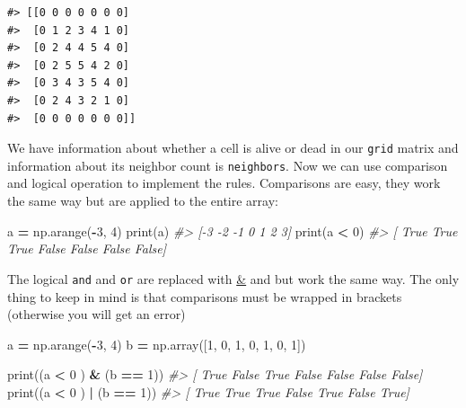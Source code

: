 \documentclass[
]{book}
\newenvironment{Shaded}{\begin{snugshade}}{\end{snugshade}}
\newcommand{\BuiltInTok}[1]{#1}
\newcommand{\CommentTok}[1]{\textcolor[rgb]{0.56,0.35,0.01}{\textit{#1}}}
\newcommand{\DecValTok}[1]{\textcolor[rgb]{0.00,0.00,0.81}{#1}}
\newcommand{\NormalTok}[1]{#1}
\newcommand{\OperatorTok}[1]{\textcolor[rgb]{0.81,0.36,0.00}{\textbf{#1}}}
\begin{document}
\begin{verbatim}
#> [[0 0 0 0 0 0 0]
#>  [0 1 2 3 4 1 0]
#>  [0 2 4 4 5 4 0]
#>  [0 2 5 5 4 2 0]
#>  [0 3 4 3 5 4 0]
#>  [0 2 4 3 2 1 0]
#>  [0 0 0 0 0 0 0]]
\end{verbatim}

We have information about whether a cell is alive or dead in our \texttt{grid} matrix and information about its neighbor count is \texttt{neighbors}. Now we can use comparison and logical operation to implement the rules. Comparisons are easy, they work the same way but are applied to the entire array:

\begin{Shaded}
\begin{Highlighting}[]
\NormalTok{a }\OperatorTok{=}\NormalTok{ np.arange(}\OperatorTok{{-}}\DecValTok{3}\NormalTok{, }\DecValTok{4}\NormalTok{)}
\BuiltInTok{print}\NormalTok{(a)}
\CommentTok{\#\textgreater{} [{-}3 {-}2 {-}1  0  1  2  3]}
\BuiltInTok{print}\NormalTok{(a }\OperatorTok{\textless{}} \DecValTok{0}\NormalTok{)}
\CommentTok{\#\textgreater{} [ True  True  True False False False False]}
\end{Highlighting}
\end{Shaded}

The logical \texttt{and} and \texttt{or} are replaced with \href{https://numpy.org/doc/stable/reference/generated/numpy.logical_and.html}{\&} and \href{https://numpy.org/doc/stable/reference/generated/numpy.logical_or.html}{\textbar{}} but work the same way. The only thing to keep in mind is that comparisons must be wrapped in brackets (otherwise you will get an error)

\begin{Shaded}
\begin{Highlighting}[]
\NormalTok{a }\OperatorTok{=}\NormalTok{ np.arange(}\OperatorTok{{-}}\DecValTok{3}\NormalTok{, }\DecValTok{4}\NormalTok{)}
\NormalTok{b }\OperatorTok{=}\NormalTok{ np.array([}\DecValTok{1}\NormalTok{, }\DecValTok{0}\NormalTok{, }\DecValTok{1}\NormalTok{, }\DecValTok{0}\NormalTok{, }\DecValTok{1}\NormalTok{, }\DecValTok{0}\NormalTok{, }\DecValTok{1}\NormalTok{])}

\BuiltInTok{print}\NormalTok{((a }\OperatorTok{\textless{}} \DecValTok{0}\NormalTok{ ) }\OperatorTok{\&}\NormalTok{ (b }\OperatorTok{==} \DecValTok{1}\NormalTok{))}
\CommentTok{\#\textgreater{} [ True False  True False False False False]}
\BuiltInTok{print}\NormalTok{((a }\OperatorTok{\textless{}} \DecValTok{0}\NormalTok{ ) }\OperatorTok{|}\NormalTok{ (b }\OperatorTok{==} \DecValTok{1}\NormalTok{))}
\CommentTok{\#\textgreater{} [ True  True  True False  True False  True]}
\end{Highlighting}
\end{Shaded}
\end{document}
